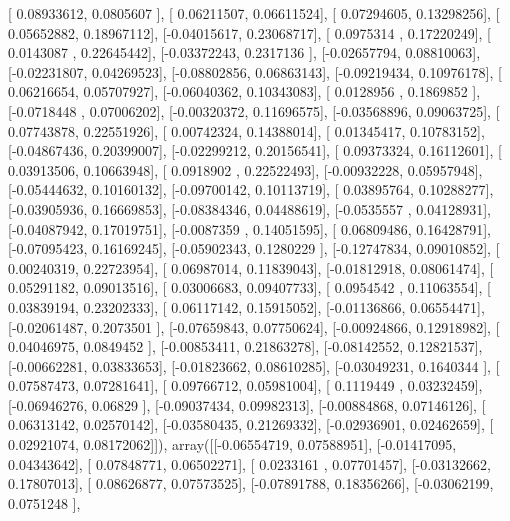 \documentclass{article}
\begin{document}
       [ 0.08933612,  0.0805607 ],
       [ 0.06211507,  0.06611524],
       [ 0.07294605,  0.13298256],
       [ 0.05652882,  0.18967112],
       [-0.04015617,  0.23068717],
       [ 0.0975314 ,  0.17220249],
       [ 0.0143087 ,  0.22645442],
       [-0.03372243,  0.2317136 ],
       [-0.02657794,  0.08810063],
       [-0.02231807,  0.04269523],
       [-0.08802856,  0.06863143],
       [-0.09219434,  0.10976178],
       [ 0.06216654,  0.05707927],
       [-0.06040362,  0.10343083],
       [ 0.0128956 ,  0.1869852 ],
       [-0.0718448 ,  0.07006202],
       [-0.00320372,  0.11696575],
       [-0.03568896,  0.09063725],
       [ 0.07743878,  0.22551926],
       [ 0.00742324,  0.14388014],
       [ 0.01345417,  0.10783152],
       [-0.04867436,  0.20399007],
       [-0.02299212,  0.20156541],
       [ 0.09373324,  0.16112601],
       [ 0.03913506,  0.10663948],
       [ 0.0918902 ,  0.22522493],
       [-0.00932228,  0.05957948],
       [-0.05444632,  0.10160132],
       [-0.09700142,  0.10113719],
       [ 0.03895764,  0.10288277],
       [-0.03905936,  0.16669853],
       [-0.08384346,  0.04488619],
       [-0.0535557 ,  0.04128931],
       [-0.04087942,  0.17019751],
       [-0.0087359 ,  0.14051595],
       [ 0.06809486,  0.16428791],
       [-0.07095423,  0.16169245],
       [-0.05902343,  0.1280229 ],
       [-0.12747834,  0.09010852],
       [ 0.00240319,  0.22723954],
       [ 0.06987014,  0.11839043],
       [-0.01812918,  0.08061474],
       [ 0.05291182,  0.09013516],
       [ 0.03006683,  0.09407733],
       [ 0.0954542 ,  0.11063554],
       [ 0.03839194,  0.23202333],
       [ 0.06117142,  0.15915052],
       [-0.01136866,  0.06554471],
       [-0.02061487,  0.2073501 ],
       [-0.07659843,  0.07750624],
       [-0.00924866,  0.12918982],
       [ 0.04046975,  0.0849452 ],
       [-0.00853411,  0.21863278],
       [-0.08142552,  0.12821537],
       [-0.00662281,  0.03833653],
       [-0.01823662,  0.08610285],
       [-0.03049231,  0.1640344 ],
       [ 0.07587473,  0.07281641],
       [ 0.09766712,  0.05981004],
       [ 0.1119449 ,  0.03232459],
       [-0.06946276,  0.06829   ],
       [-0.09037434,  0.09982313],
       [-0.00884868,  0.07146126],
       [ 0.06313142,  0.02570142],
       [-0.03580435,  0.21269332],
       [-0.02936901,  0.02462659],
       [ 0.02921074,  0.08172062]]), array([[-0.06554719,  0.07588951],
       [-0.01417095,  0.04343642],
       [ 0.07848771,  0.06502271],
       [ 0.0233161 ,  0.07701457],
       [-0.03132662,  0.17807013],
       [ 0.08626877,  0.07573525],
       [-0.07891788,  0.18356266],
       [-0.03062199,  0.0751248 ],
\end{document}
